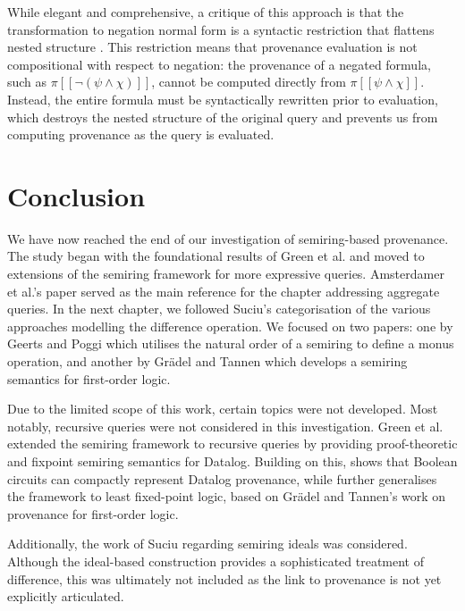 \documentclass[oneside, 11pt]{amsbook}
\theoremstyle{plain}
\theoremstyle{definition}
\theoremstyle{remark}
\begin{document}
While elegant and comprehensive, a critique of this approach is that the transformation to negation normal form is a syntactic restriction that flattens nested structure \cite{Badia2025}. This restriction means that provenance evaluation is not compositional with respect to negation: the provenance of a negated formula, such as $\pi[\![ \neg (\psi \land \chi) ]\!]$, cannot be computed directly from $\pi[\![ \psi \land \chi ]\!]$. Instead, the entire formula must be syntactically rewritten prior to evaluation, which destroys the nested structure of the original query and prevents us from computing provenance as the query is evaluated.

\chapter{Conclusion}
\label{chapter:conclusion}

We have now reached the end of our investigation of semiring-based provenance. The study began with the foundational results of Green et al. \cite{Green2007} and moved to extensions of the semiring framework for more expressive queries. Amsterdamer et al.'s paper \cite{Amsterdamer2011b} served as the main reference for the chapter addressing aggregate queries. In the next chapter, we followed Suciu's \cite{Suciu2024} categorisation of the various approaches modelling the difference operation. We focused on two papers: one by Geerts and Poggi \cite{Geerts2010} which utilises the natural order of a semiring to define a monus operation, and another by Grädel and Tannen \cite{Gradel2025} which develops a semiring semantics for first-order logic.

Due to the limited scope of this work, certain topics were not developed. Most notably, recursive queries were not considered in this investigation. Green et al. \cite{Green2007} extended the semiring framework to recursive queries by providing proof-theoretic and fixpoint semiring semantics for Datalog. Building on this, \cite{Deutch2014} shows that Boolean circuits can compactly represent Datalog provenance, while \cite{Dannert2021} further generalises the framework to least fixed-point logic, based on Grädel and Tannen's work on provenance for first-order logic.

Additionally, the work of Suciu \cite{Suciu2024} regarding semiring ideals was considered. Although the ideal-based construction provides a sophisticated treatment of difference, this was ultimately not included as the link to provenance is not yet explicitly articulated.
\end{document}
